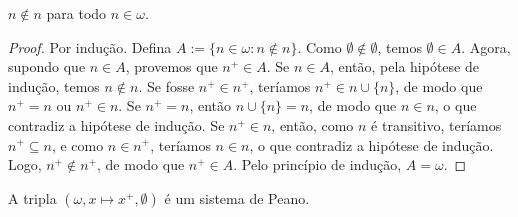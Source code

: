 \begin{corollary} \label{lema.set:omega_irreflexivo}
    $n \notin n$ para todo $n \in \omega$.
\end{corollary}

\begin{proof}
    Por indução. Defina $A := \{n \in \omega : n \notin n\}$. Como $\emptyset \notin \emptyset$, temos $\emptyset \in A$. Agora, supondo que $n \in A$, provemos que $n^+ \in A$. Se $n \in A$, então, pela hipótese de indução, temos $n \notin n$. Se fosse $n^+ \in n^+$, teríamos $n^+ \in n \cup \{n\}$, de modo que $n^+ = n$ ou $n^+ \in n$. Se $n^+ = n$, então $n \cup \{n\} = n$, de modo que $n \in n$, o que contradiz a hipótese de indução. Se $n^+ \in n$, então, como $n$ é transitivo, teríamos $n^+ \subseteq n$, e como $n \in n^+$, teríamos $n \in n$, o que contradiz a hipótese de indução. Logo, $n^+ \notin n^+$, de modo que $n^+ \in A$. Pelo princípio de indução, $A = \omega$. \blackproof
\end{proof}

\begin{theorem} \label{teo.set:existe_peano}
    A tripla $(\omega, x \mapsto x^+, \emptyset)$ é um sistema de Peano.
\end{theorem}

